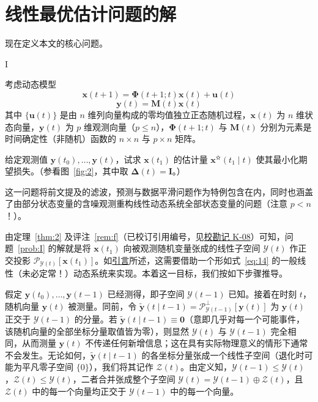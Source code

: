 \section{线性最优估计问题的解}\label{sec:sol}

现在定义本文的核心问题。

\begin{problemn}{I}\label{prob:I}

考虑动态模型
\begin{equation}\label{eq:16}
\bm{x}(t + 1) = \bm{\Phi}(t + 1; t)\bm{x}(t) + \bm{u}(t)
\end{equation}
\begin{equation}\label{eq:17}
\bm{y}(t) = \bm{M}(t)\bm{x}(t)
\end{equation}
其中 $\{\bm{u}(t)\}$ 是由 $n$ 维列向量构成的零均值独立正态随机过程，$\bm{x}(t)$ 为 $n$ 维状态向量，$\bm{y}(t)$ 为 $p$ 维观测向量（$p \leq n$），$\bm{\Phi}(t + 1; t)$ 与 $\bm{M}(t)$ 分别为元素是时间确定性（非随机）函数的 $n \times n$ 与 $p \times n$ 矩阵。

给定观测值 $\bm{y}(t_0), \dots, \bm{y}(t)$，试求 $\bm{x}(t_1)$ 的估计量 $\bm{x}^{\text{✫}}(t_1 \mid t)$ 使其最小化期望损失。（参看图~\ref{fig:2}，其中取 $\bm{\Delta}(t) = \bm{I}$。）

\end{problemn}

这一问题将前文提及的滤波，预测与数据平滑问题作为特例包含在内，同时也涵盖了由部分状态变量的含噪观测重构线性动态系统全部状态变量的问题（注意 $p < n$！）。

由定理~\ref{thm:2} 及评注~\ref{rem:f}（已校订引用编号，见\hyperref[sec:k08]{校勘记 K-08}）可知，问题~\ref{prob:I} 的解就是将 $\bm{x}(t_1)$ 向被观测随机变量张成的线性子空间 $\mathcal{Y}(t)$ 作正交投影 $\mathscr{P}_{\mathcal{Y}(t)}[\bm{x}(t_1)]$。如\hyperref[sec:intro]{引言}所述，这需要借助一个形如式~\eqref{eq:14} 的一般线性（未必定常！）动态系统来实现。本着这一目标，我们按如下步骤推导。

假定 $\bm{y}(t_0), \dots, \bm{y}(t - 1)$ 已经测得，即子空间 $\mathcal{Y}(t - 1)$ 已知。接着在时刻 $t$，随机向量 $\bm{y}(t)$ 被测量。同前，令 $\tilde{\bm{y}}(t \mid t - 1) = \mathscr{P}_{\mathcal{Y}(t - 1)}^{\perp}[\bm{y}(t)]$ 为 $\bm{y}(t)$ 正交于 $\mathcal{Y}(t - 1)$ 的分量。若 $\tilde{\bm{y}}(t \mid t - 1) \equiv \bm{0}$（意即几乎对每一个可能事件，该随机向量的全部坐标分量取值皆为零），则显然 $\mathcal{Y}(t)$ 与 $\mathcal{Y}(t - 1)$ 完全相同，从而测量 $\bm{y}(t)$ 不传递任何新增信息；这在具有实际物理意义的情形下通常不会发生。无论如何，$\tilde{\bm{y}}(t \mid t - 1)$ 的各坐标分量张成一个线性子空间（退化时可能为平凡零子空间 $\{0\}$），我们将其记作 $\mathcal{Z}(t)$。由定义知，$\mathcal{Y}(t - 1) \leqslant \mathcal{Y}(t)$，$\mathcal{Z}(t) \leqslant \mathcal{Y}(t)$，二者合并张成整个子空间 $\mathcal{Y}(t) = \mathcal{Y}(t - 1) \oplus \mathcal{Z}(t)$，且 $\mathcal{Z}(t)$ 中的每一个向量均正交于 $\mathcal{Y}(t - 1)$ 中的每一个向量。

